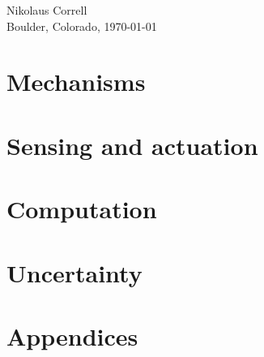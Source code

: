 \documentclass[paper=7in:9in,pagesize=pdftex,11pt,twoside,openright]{scrbook}
\begin{document}
\begin{flushright}
Nikolaus Correll\\
Boulder, Colorado, \today
\end{flushright}



\part{Mechanisms}





\part{Sensing and actuation}



\part{Computation}








\part{Uncertainty}




\part{Appendices}
\appendix













\printindex
\end{document}
